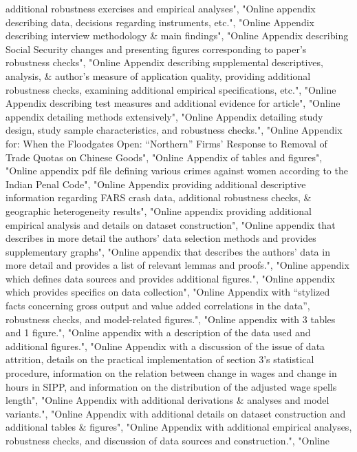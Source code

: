 \documentclass[]{article}
\begin{document}
\begin{itemize}
  additional robustness exercises and empirical analyses", "Online
  appendix describing data, decisions regarding instruments, etc.",
  "Online Appendix describing interview methodology \& main findings",
  "Online Appendix describing Social Security changes and presenting
  figures corresponding to paper's robustness checks", "Online Appendix
  describing supplemental descriptives, analysis, \& author's measure of
  application quality, providing additional robustness checks, examining
  additional empirical specifications, etc.", "Online Appendix
  describing test measures and additional evidence for article", "Online
  appendix detailing methods extensively", "Online Appendix detailing
  study design, study sample characteristics, and robustness checks.",
  "Online Appendix for: When the Floodgates Open: ``Northern'' Firms'
  Response to Removal of Trade Quotas on Chinese Goods", "Online
  Appendix of tables and figures", "Online appendix pdf file defining
  various crimes against women according to the Indian Penal Code",
  "Online Appendix providing additional descriptive information
  regarding FARS crash data, additional robustness checks, \& geographic
  heterogeneity results", "Online appendix providing additional
  empirical analysis and details on dataset construction", "Online
  appendix that describes in more detail the authors' data selection
  methods and provides supplementary graphs", "Online appendix that
  describes the authors' data in more detail and provides a list of
  relevant lemmas and proofs.", "Online appendix which defines data
  sources and provides additional figures.", "Online appendix which
  provides specifics on data collection", "Online Appendix with
  ``stylized facts concerning gross output and value added correlations
  in the data'', robustness checks, and model-related figures.", "Online
  appendix with 3 tables and 1 figure.", "Online appendix with a
  description of the data used and additional figures.", "Online
  Appendix with a discussion of the issue of data attrition, details on
  the practical implementation of section 3's statistical procedure,
  information on the relation between change in wages and change in
  hours in SIPP, and information on the distribution of the adjusted
  wage spells length", "Online Appendix with additional derivations \&
  analyses and model variants.", "Online Appendix with additional
  details on dataset construction and additional tables \& figures",
  "Online Appendix with additional empirical analyses, robustness
  checks, and discussion of data sources and construction.", "Online

\end{itemize}
\end{document}
